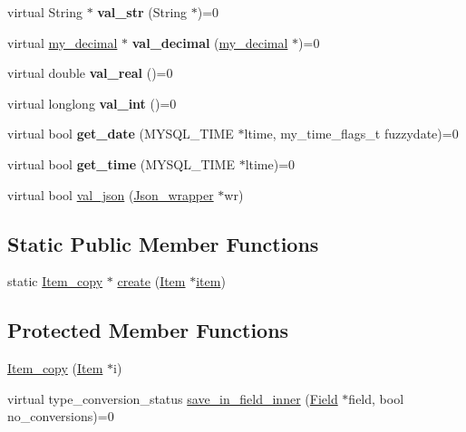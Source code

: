 \begin{DoxyCompactItemize}
virtual String $\ast$ {\bfseries val\+\_\+str} (String $\ast$)=0
\item 
\mbox{\label{classItem__copy_ae33854ef9fd9897afddf2db52cac1ec9}} 
virtual \mbox{\hyperlink{classmy__decimal}{my\+\_\+decimal}} $\ast$ {\bfseries val\+\_\+decimal} (\mbox{\hyperlink{classmy__decimal}{my\+\_\+decimal}} $\ast$)=0
\item 
\mbox{\label{classItem__copy_a13b571456e140784f9f28eb45cebece2}} 
virtual double {\bfseries val\+\_\+real} ()=0
\item 
\mbox{\label{classItem__copy_a4ca63683b0932c4f074524dcf92051d3}} 
virtual longlong {\bfseries val\+\_\+int} ()=0
\item 
\mbox{\label{classItem__copy_a0e0ebb5a6c84bb6031706ba3080c72f7}} 
virtual bool {\bfseries get\+\_\+date} (M\+Y\+S\+Q\+L\+\_\+\+T\+I\+ME $\ast$ltime, my\+\_\+time\+\_\+flags\+\_\+t fuzzydate)=0
\item 
\mbox{\label{classItem__copy_a44d7aabf33e8acec5533b76c6a17269e}} 
virtual bool {\bfseries get\+\_\+time} (M\+Y\+S\+Q\+L\+\_\+\+T\+I\+ME $\ast$ltime)=0
\item 
virtual bool \mbox{\hyperlink{classItem__copy_ab74e3b8e79f623d7caabec195ab69a11}{val\+\_\+json}} (\mbox{\hyperlink{classJson__wrapper}{Json\+\_\+wrapper}} $\ast$wr)
\end{DoxyCompactItemize}
\subsection*{Static Public Member Functions}
\begin{DoxyCompactItemize}
\item 
static \mbox{\hyperlink{classItem__copy}{Item\+\_\+copy}} $\ast$ \mbox{\hyperlink{classItem__copy_af6d92b94c26733316776b982dae9d8fe}{create}} (\mbox{\hyperlink{classItem}{Item}} $\ast$\mbox{\hyperlink{classItem__copy_a9ef1b9fd547a3b940e89e9837083c87f}{item}})
\end{DoxyCompactItemize}
\subsection*{Protected Member Functions}
\begin{DoxyCompactItemize}
\item 
\mbox{\hyperlink{classItem__copy_af5168f3a1773e2cce8b34de3cec425b2}{Item\+\_\+copy}} (\mbox{\hyperlink{classItem}{Item}} $\ast$i)
\item 
virtual type\+\_\+conversion\+\_\+status \mbox{\hyperlink{classItem__copy_af4b55bf8c530188fa2110728a512811b}{save\+\_\+in\+\_\+field\+\_\+inner}} (\mbox{\hyperlink{classField}{Field}} $\ast$field, bool no\+\_\+conversions)=0
\end{DoxyCompactItemize}
